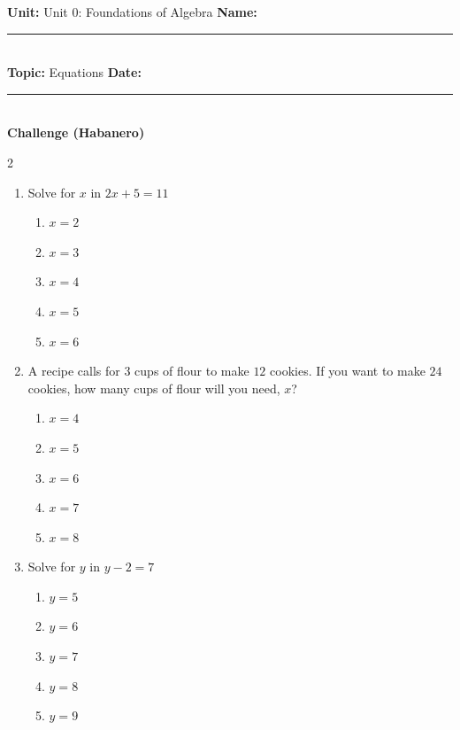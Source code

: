 \documentclass[10pt]{article}
\begin{document}
\enlargethispage{2.5cm}

\begin{tcolorbox}[colback=mainblue!5, colframe=mainblue, sharp corners, boxrule=0.5pt]
    \small \textbf{Unit:} Unit 0: Foundations of Algebra \hfill \textbf{Name:} \rule{3cm}{0.4pt} \\
    \small \textbf{Topic:} Equations \hfill \textbf{Date:} \rule{2cm}{0.4pt} \\
    \centering \textbf{\large Challenge (Habanero)}
\end{tcolorbox}

\vspace{0.2cm}

\begin{multicols}{2}
\begin{enumerate}[label=\textbf{Q\arabic*.}, leftmargin=*, itemsep=6pt, parsep=0pt]

  \item \small Solve for $x$ in $2x + 5 = 11$
  \begin{enumerate}[label=(\Alph*), leftmargin=0.6cm, nosep, itemsep=2pt]
    \item $x = 2$
    \item $x = 3$
    \item $x = 4$
    \item $x = 5$
    \item $x = 6$
  \end{enumerate}

  \item \small A recipe calls for $3$ cups of flour to make $12$ cookies. If you want to make $24$ cookies, how many cups of flour will you need, $x$?
  \begin{enumerate}[label=(\Alph*), leftmargin=0.6cm, nosep, itemsep=2pt]
    \item $x = 4$
    \item $x = 5$
    \item $x = 6$
    \item $x = 7$
    \item $x = 8$
  \end{enumerate}

  \item \small Solve for $y$ in $y - 2 = 7$
  \begin{enumerate}[label=(\Alph*), leftmargin=0.6cm, nosep, itemsep=2pt]
    \item $y = 5$
    \item $y = 6$
    \item $y = 7$
    \item $y = 8$
    \item $y = 9$
  \end{enumerate}


\end{enumerate}
\end{multicols}
\end{document}
